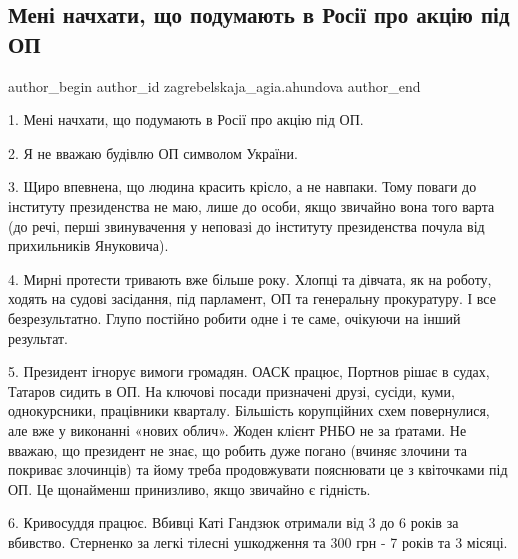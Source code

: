  
 
 
 
 
 
\subsection{Мені начхати, що подумають в Росії про акцію під ОП}
\label{sec:21_03_2021.fb.zagrebelskaja_agia.ahundova.1.akcia_ofis_prezidenta}
 
\ifcmt
 author_begin
   author_id zagrebelskaja_agia.ahundova
 author_end
\fi

1. Мені начхати, що подумають в Росії про акцію під ОП.

2. Я не вважаю будівлю ОП символом України.

3. Щиро впевнена, що людина красить крісло, а не навпаки. Тому поваги до
інституту президенства не маю,  лише до особи, якщо звичайно вона того варта
(до речі, перші звинувачення у неповазі до інституту президенства почула від
прихильників Януковича).

4. Мирні протести тривають вже більше року. Хлопці та дівчата, як на роботу,
ходять на судові засідання, під парламент, ОП та генеральну прокуратуру. І все
безрезультатно. Глупо постійно робити одне і те саме, очікуючи на інший
результат.  

5. Президент ігнорує вимоги громадян. ОАСК працює, Портнов рішає в судах,
Татаров сидить в ОП. На ключові посади призначені друзі, сусіди, куми,
однокурсники, працівники кварталу. Більшість корупційних схем повернулися, але
вже у виконанні «нових облич». Жоден клієнт РНБО не за ґратами. Не вважаю, що
президент не знає, що робить дуже погано (вчиняє злочини та покриває злочинців)
та йому треба продовжувати пояснювати це з квіточками під ОП. Це щонайменш
принизливо, якщо звичайно є гідність. 

6. Кривосуддя працює. Вбивці Каті Гандзюк отримали від 3 до 6 років за
вбивство. Стерненко за легкі тілесні ушкодження та 300 грн - 7 років та 3
місяці. 

